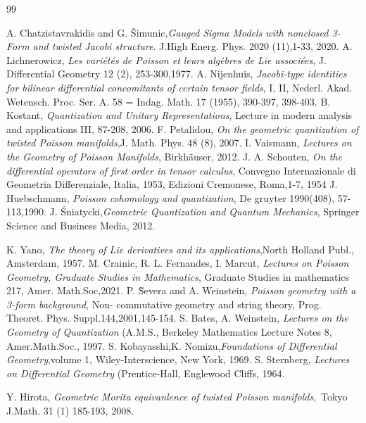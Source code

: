 \documentclass[a4paper,10pt]{article}
\numberwithin{equation}{section}
\theoremstyle{plain}
\begin{document}
	
	
	
	
	
	\begin{thebibliography}{99}









		A. Chatzistavrakidis and G. Šimunic,\textit{Gauged Sigma Models with nonclosed 3-Form and twisted Jacobi structure}. J.High Energ. Phys. 2020 (11),1-33, 2020.
 A. Lichnerowicz, \textit{Les vari\'{e}t\'{e}s de Poisson et leurs alg\`{e}bres de Lie associ\'{e}es}, J. Differential Geometry 12 (2), 253-300,1977.
		A. Nijenhuis, \textit{Jacobi-type identities for bilinear differential concomitants of certain tensor fields}, I, II, Nederl. Akad. Wetensch. Proc. Ser. A. 58 = Indag. Math. 17 (1955), 390-397,
		398-403.
		B. Kostant, \textit{Quantization and Unitary Representations}, Lecture in modern analysis and applications III, 87-208, 2006.
		 F. Petalidou, \textit{On the geometric quantization of twisted Poisson manifolds},J. Math. Phys. 48 (8), 2007.
 I. Vaismann, \textit{Lectures on the Geometry of Poisson Manifolds}, Birkh\"auser, 2012.
		 J. A. Schouten, \textit{On the differential operators of first order in tensor calculus}, Convegno Internazionale di Geometria Differenziale, Italia, 1953, Edizioni Cremonese, Roma,1-7, 1954
		 J. Huebschmann, \textit{Poisson cohomology and quantization}, De gruyter 1990(408), 57-113,1990.
		J. \'{S}niatycki,\textit{Geometric Quantization and Quantum Mechanics}, Springer Science and Business Media, 2012.
		
		K. Yano, \textit{The theory of Lie derivatives and its applications},North Holland Publ.,
		Amsterdam, 1957.
		 M. Crainic, R. L. Fernandes, I. Marcut,  \textit{Lectures on Poisson Geometry, Graduate Studies in Mathematics}, Graduate Studies in mathematics 217, Amer. Math.Soc,2021.
		 P. \~Severa and A. Weinstein, \textit{ Poisson geometry with a 3-form background}, Non-
		commutative geometry and string theory, Prog. Theoret. Phys. Suppl.144,2001,145-154.
		 S. Bates, A. Weinstein,\textit{ Lectures on the Geometry of Quantization}  (A.M.S.,
		Berkeley Mathematics Lecture Notes 8, Amer.Math.Soc., 1997.
		S. Kobayasshi,K. Nomizu,\textit{Foundations of Differential Geometry},volume 1, Wiley-Interscience, New
		York, 1969.
		 S. Sternberg,  \textit{Lectures on Differential Geometry }(Prentice-Hall, Englewood Cliffs,
		1964.
		
		 Y. Hirota,  \textit{Geometric Morita equivanlence of twisted Poisson manifolds},\ Tokyo J.Math. 31 (1) 185-193, 2008.
		
		
		
	\end{thebibliography}
\end{document}
